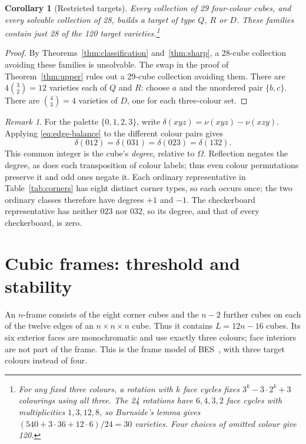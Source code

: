 \documentclass[11pt]{article}
\newtheorem{corollary}{Corollary}
\theoremstyle{remark}
\newtheorem*{remark}{Remark}
\begin{document}
\begin{corollary}[Restricted targets]\label{cor:restricted}
Every collection of 29 four-colour cubes, and every solvable collection of
28, builds a target of type $Q$, $R$ or $D$. These families contain just
28 of the 120 target varieties.\footnote{For any fixed three colours, a
rotation with $k$ face cycles fixes $3^k-3\cdot2^k+3$ colourings using all
three. The 24 rotations have $6,4,3,2$ face cycles with multiplicities
$1,3,12,8$, so Burnside's lemma gives
$(540+3\cdot36+12\cdot6)/24=30$ varieties. Four choices of omitted colour
give 120.}
\end{corollary}
\begin{proof}
By Theorems~\ref{thm:classification} and~\ref{thm:sharp}, a 28-cube collection
avoiding these families is unsolvable. The swap in the proof of
Theorem~\ref{thm:upper} rules out a 29-cube collection avoiding them.
There are $4\binom{3}{2}=12$ varieties each of $Q$ and $R$: choose $a$ and
the unordered pair $\{b,c\}$. There are $\binom{4}{3}=4$ varieties of $D$,
one for each three-colour set.
\end{proof}

\begin{remark}
For the palette $\{0,1,2,3\}$, write
$\delta(xyz)=\nu(xyz)-\nu(xzy)$. Applying \eqref{eq:edge-balance} to the
different colour pairs gives
\[
 \delta(012)=\delta(031)=\delta(023)=\delta(132).
\]
This common integer is the cube's \emph{degree}, relative to $\Omega$.
Reflection negates the degree, as does each transposition of colour labels;
thus even colour permutations preserve it and odd ones negate it.
Each ordinary representative in Table~\ref{tab:corners} has eight distinct
corner types, so each occurs once; the two ordinary classes therefore
have degrees $+1$ and $-1$. The checkerboard representative has neither
$023$ nor $032$, so its degree, and that of every checkerboard, is zero.
\end{remark}

\section{Cubic frames: threshold and stability}\label{sec:frames}
An $n$-frame consists of the eight corner cubes and the $n-2$ further cubes
on each of the twelve edges of an $n\times n\times n$ cube. Thus it contains
$L=12n-16$ cubes. Its six exterior faces are monochromatic and use exactly
three colours; face interiors are not part of the frame. This is the frame
model of BES~\cite[Section 1]{BES}, with three target colours instead of four.
\end{document}
